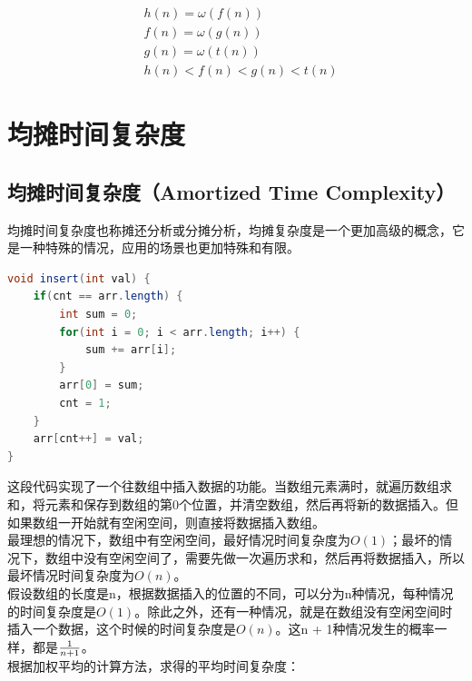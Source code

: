 \begin{align*}
     & h(n) = \omega(f(n))       \\
     & f(n) = \omega(g(n))       \\
     & g(n) = \omega(t(n))       \\
     & h(n) < f(n) < g(n) < t(n)
\end{align*}

\newpage

\section{均摊时间复杂度}

\subsection{均摊时间复杂度（Amortized Time Complexity）}

均摊时间复杂度也称摊还分析或分摊分析，均摊复杂度是一个更加高级的概念，它是一种特殊的情况，应用的场景也更加特殊和有限。

\vspace{-0.5cm}

\begin{lstlisting}[language=Java]
void insert(int val) {
    if(cnt == arr.length) {
        int sum = 0;
        for(int i = 0; i < arr.length; i++) {
            sum += arr[i];
        }
        arr[0] = sum;
        cnt = 1;
    }
    arr[cnt++] = val;
}
\end{lstlisting}

这段代码实现了一个往数组中插入数据的功能。当数组元素满时，就遍历数组求和，将元素和保存到数组的第0个位置，并清空数组，然后再将新的数据插入。但如果数组一开始就有空闲空间，则直接将数据插入数组。 \\

最理想的情况下，数组中有空闲空间，最好情况时间复杂度为$ O(1) $；最坏的情况下，数组中没有空闲空间了，需要先做一次遍历求和，然后再将数据插入，所以最坏情况时间复杂度为$ O(n) $。 \\

假设数组的长度是n，根据数据插入的位置的不同，可以分为n种情况，每种情况的时间复杂度是$ O(1) $。除此之外，还有一种情况，就是在数组没有空闲空间时插入一个数据，这个时候的时间复杂度是$ O(n) $。这n + 1种情况发生的概率一样，都是$ 1 \over n+1 $。 \\

根据加权平均的计算方法，求得的平均时间复杂度：

\vspace{-0.5cm}

